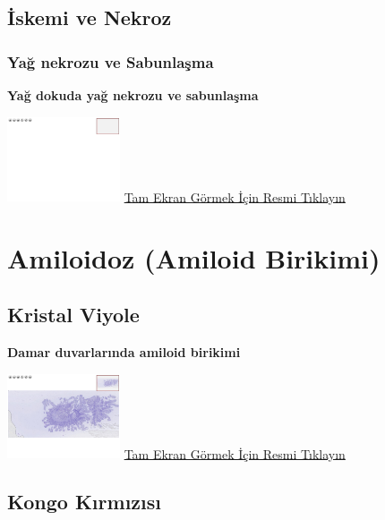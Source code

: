 \documentclass[
  letterpaper,
  DIV=11,
  numbers=noendperiod]{scrreprt}
\begin{document}
\hypertarget{sec-iskemi-ve-nekroz}{%
\section{İskemi ve Nekroz}\label{sec-iskemi-ve-nekroz}}

\hypertarget{sec-yag-nekrozu-sabunlasma}{%
\subsection{Yağ nekrozu ve
Sabunlaşma}\label{sec-yag-nekrozu-sabunlasma}}

\textbf{Yağ dokuda yağ nekrozu ve sabunlaşma}

\href{https://images.patolojiatlasi.com/template/HE.html}{\includegraphics[width=0.25\textwidth,height=\textheight]{./screenshots/template_screenshot.png}}
\href{https://images.patolojiatlasi.com/fat-necrosis/HE.html}{Tam Ekran
Görmek İçin Resmi Tıklayın}

\hypertarget{sec-amiloidoz}{%
\chapter{Amiloidoz (Amiloid Birikimi)}\label{sec-amiloidoz}}

\hypertarget{sec-amiloidoz-kristal-viyole}{%
\section{Kristal Viyole}\label{sec-amiloidoz-kristal-viyole}}

\textbf{Damar duvarlarında amiloid birikimi}

\href{https://images.patolojiatlasi.com/amyloid/crystalviolet.html}{\includegraphics[width=0.25\textwidth,height=\textheight]{./screenshots/crystalviolet_screenshot.png}}
\href{https://images.patolojiatlasi.com/amyloid/crystalviolet.html}{Tam
Ekran Görmek İçin Resmi Tıklayın}

\hypertarget{sec-amiloidoz-kongo-kirmizisi}{%
\section{Kongo Kırmızısı}\label{sec-amiloidoz-kongo-kirmizisi}}
\end{document}
